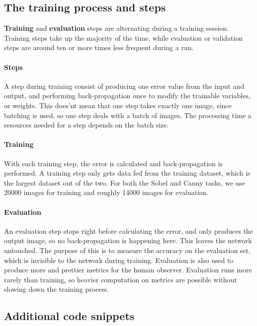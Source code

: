 \documentclass[a4paper,12pt]{article}
\begin{document}
\subsection{The training process and steps}
\textbf{Training} and \textbf{evaluation} steps are alternating during a training session. Training steps take up the majority of the time, while evaluation or validation steps are around ten or more times less frequent during a run.
\paragraph{Steps}
A step during training consist of producing one error value from the input and output, and performing back-propagation once to modify the trainable variables, or weights. This does'nt mean that one step takes exactly one image, since batching is used, so one step deals with a batch of images. The processing time a resources needed for a step depends on the batch size.
\paragraph{Training}
With each training step, the error is calculated and back-propagation is performed. A training step only gets data fed from the training dataset, which is the largest dataset out of the two. For both the Sobel and Canny tasks, we use 20000 images for training and roughly 14000 images for evaluation.
\paragraph{Evaluation}
An evaluation step stops right before calculating the error, and only produces the output image, so no back-propagation is happening here. This leaves the network untouched. The purpose of this is to measure the accuracy on the evaluation set, which is invisible to the network during training. Evaluation is also used to produce more and prettier metrics for the human observer. Evaluation runs more rarely than training, so heavier computation on metrics are possible without slowing down the training process.
\subsection{Additional code snippets}
\end{document}
